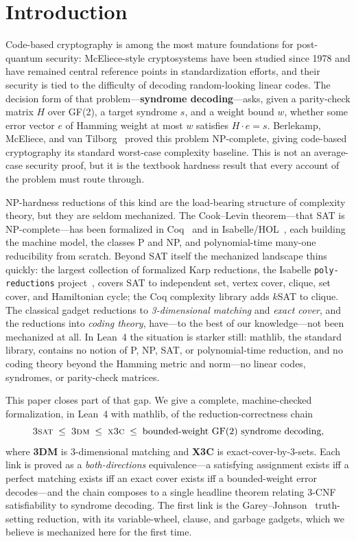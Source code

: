 \documentclass[a4paper,UKenglish,cleveref,autoref]{lipics-v2021}
\begin{document}
\section{Introduction}\label{sec:intro}

Code-based cryptography is among the most mature foundations for post-quantum security: McEliece-style
cryptosystems have been studied since 1978 and have remained central reference points in standardization
efforts, and their security is tied to the difficulty of decoding random-looking linear codes. The decision
form of that problem---\textbf{syndrome decoding}---asks, given a parity-check matrix $H$ over GF(2), a target
syndrome $s$, and a weight bound $w$, whether some error vector $e$ of Hamming weight at most $w$ satisfies
$H \cdot e = s$. Berlekamp, McEliece, and van Tilborg~\cite{BMvT78} proved this problem NP-complete, giving
code-based cryptography its standard worst-case complexity baseline. This is not an average-case security proof,
but it is the textbook hardness result that every account of the problem must route through.

NP-hardness reductions of this kind are the load-bearing structure of complexity theory, but they are seldom
mechanized. The Cook--Levin theorem---that SAT is NP-complete---has been formalized in Coq~\cite{GK21} and in
Isabelle/HOL~\cite{Bal23}, each building the machine model, the classes P and NP, and polynomial-time many-one
reducibility from scratch. Beyond SAT itself the mechanized landscape thins quickly: the largest collection of
formalized Karp reductions, the Isabelle \lstinline{poly-reductions} project~\cite{PolyRed}, covers SAT to
independent set, vertex cover, clique, set cover, and Hamiltonian cycle; the Coq complexity library adds
$k$SAT to clique. The classical gadget reductions to \emph{3-dimensional matching} and \emph{exact cover}, and
the reductions into \emph{coding theory}, have---to the best of our knowledge---not been mechanized at all. In
Lean~4 the situation is starker still: mathlib, the standard library, contains no notion of P, NP, SAT, or
polynomial-time reduction, and no coding theory beyond the Hamming metric and norm---no linear codes, syndromes,
or parity-check matrices.

This paper closes part of that gap. We give a complete, machine-checked formalization, in Lean~4 with mathlib,
of the reduction-correctness chain
\[
  \textsc{3sat} \;\le\; \textsc{3dm} \;\le\; \textsc{x3c} \;\le\; \text{bounded-weight GF(2) syndrome decoding,}
\]
where \textbf{3DM} is 3-dimensional matching and \textbf{X3C} is exact-cover-by-3-sets. Each link is proved as a
\emph{both-directions} equivalence---a satisfying assignment exists iff a perfect matching exists iff an exact
cover exists iff a bounded-weight error decodes---and the chain composes to a single headline theorem relating
3-CNF satisfiability to syndrome decoding. The first link is the Garey--Johnson~\cite{GJ79} truth-setting
reduction, with its variable-wheel, clause, and garbage gadgets, which we believe is mechanized here for the
first time.
\end{document}
